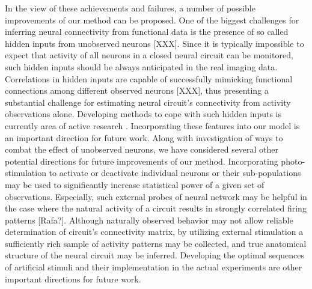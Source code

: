 In the view of these achievements and failures, a number of possible improvements of our method can be proposed. One of the biggest challenges for inferring neural connectivity from functional data is the presence of so called hidden inputs from unobserved neurons [XXX]. Since it is typically impossible to expect that activity of all neurons in a closed neural circuit can be monitored, such hidden inputs should be always anticipated in the real imaging data. Correlations in hidden inputs are capable of successfully mimicking functional connections among different observed neurons [XXX], thus presenting a substantial challenge for estimating neural circuit's connectivity from activity observations alone. Developing methods to cope with such hidden inputs is currently area of active research \cite{Duane 1 and 2, liam}.  Incorporating these features into our model is an important direction for future work.
Along with investigation of ways to combat the effect of unobserved neurons, we have considered several other potential directions for future improvements of our method.  Incorporating photo-stimulation to activate or deactivate individual neurons or their sub-populations may be used to significantly increase statistical power of a given set of observations. Especially, such external probes of neural network may be helpful in the case where the natural activity of a circuit results in strongly correlated firing patterns [Rafa?]. Although naturally observed behavior may not allow reliable determination of circuit's connectivity matrix, by utilizing external stimulation a sufficiently rich sample of activity patterns may be collected, and true anatomical structure of the neural circuit may be inferred. Developing the optimal sequences of artificial stimuli and their implementation in the actual experiments are other important directions for future work.

